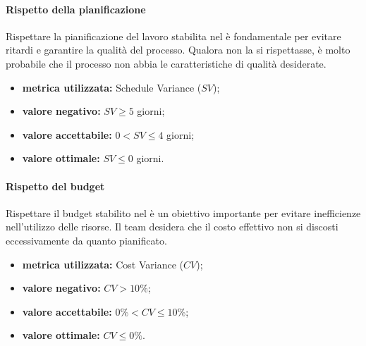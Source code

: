 %								
%						
%								

			\paragraph{Rispetto della pianificazione}
				\label{ORDP}
				Rispettare la pianificazione del lavoro stabilita nel \pdpv{} è fondamentale per evitare ritardi e garantire la qualità del processo. Qualora non la si rispettasse, è molto probabile che il processo non abbia le caratteristiche di qualità desiderate.
				\begin{itemize}
					\item \textbf{metrica utilizzata:} Schedule Variance ($SV$);
					\item \textbf{valore negativo:} $SV\geq5$ giorni;
					\item \textbf{valore accettabile:} $0<SV\leq 4$ giorni;
					\item \textbf{valore ottimale:} $SV\leq0$ giorni.
				\end{itemize}

			\paragraph{Rispetto del budget}
				\label{ORDB}
				Rispettare il budget stabilito nel \pdpv{} è un obiettivo importante per evitare inefficienze nell'utilizzo delle risorse. Il team desidera che il costo effettivo non si discosti eccessivamente da quanto pianificato.
				\begin{itemize}
					\item \textbf{metrica utilizzata:} Cost Variance ($CV$);
					\item \textbf{valore negativo:} $CV>10\%$;
					\item \textbf{valore accettabile:} $0\%<CV\leq 10\%$;
					\item \textbf{valore ottimale:} $CV\leq 0\%$.
				\end{itemize}
			
